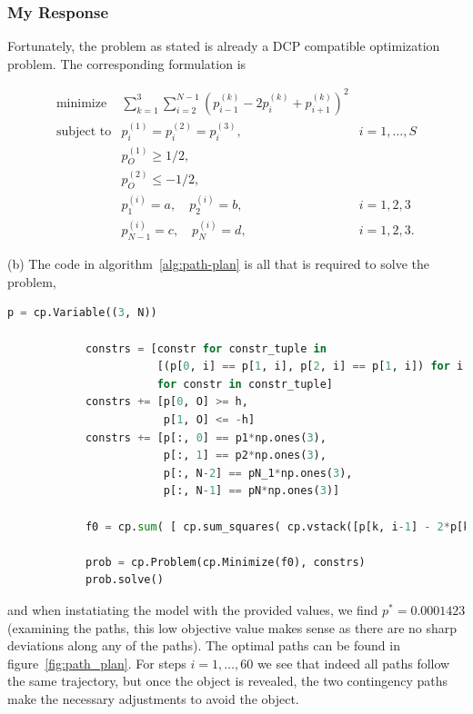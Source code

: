 \documentclass[12pt,reqno]{article}
\theoremstyle{definition}
\numberwithin{equation}{section}
\begin{document}
\subsubsection*{My Response}

Fortunately, the problem as stated is already a DCP compatible optimization problem. The corresponding formulation is

\[\begin{array}{lll}
\text{minimize} \; & \sum_{k=1}^3 \sum_{i=2}^{N-1}\left(p_{i-1}^{(k)}-2 p_i^{(k)}+p_{i+1}^{(k)}\right)^2 & \\
\text{subject to} & p_{i}^{(1)} = p_{i}^{(2)} = p_{i}^{(3)}, & i = 1, \ldots, S \\
& p_{O}^{(1)} \ge 1/2, & \\
& p_{O}^{(2)} \le -1/2, & \\
& p^{(i)}_{1} = a, \quad p^{(i)}_{2} = b, & i = 1, 2, 3 \\
& p^{(i)}_{N-1} = c, \quad p^{(i)}_{N} = d, & i = 1, 2, 3.
\end{array}\]

\noindent (b) The code in algorithm~\ref{alg:path-plan} is all that is required to solve the problem,
\begin{algorithm}[htbp]
    \caption{Path Planning Code}
    \centering
        \begin{lstlisting}[language=Python]
            p = cp.Variable((3, N))

            constrs = [constr for constr_tuple in
                       [(p[0, i] == p[1, i], p[2, i] == p[1, i]) for i in range(2, S+1)]
                       for constr in constr_tuple]
            constrs += [p[0, O] >= h,
                        p[1, O] <= -h]
            constrs += [p[:, 0] == p1*np.ones(3),
                        p[:, 1] == p2*np.ones(3),
                        p[:, N-2] == pN_1*np.ones(3),
                        p[:, N-1] == pN*np.ones(3)]
            
            f0 = cp.sum( [ cp.sum_squares( cp.vstack([p[k, i-1] - 2*p[k, i] + p[k, i+1] for i in range(2, N-2)]) ) for k in range(3)] )
            
            prob = cp.Problem(cp.Minimize(f0), constrs)
            prob.solve()
        \end{lstlisting}
    \label{alg:path-plan}
\end{algorithm}
and when instatiating the model with the provided values, we find $p^* = 0.0001423$ (examining
the paths, this low objective value makes sense as there are no sharp deviations
along any of the paths). 
The optimal paths can be found in figure~\ref{fig:path_plan}. For steps $i=1, \ldots, 60$ we see that
indeed all paths follow the same trajectory, but once the object is revealed, the two contingency paths
make the necessary adjustments to avoid the object.
\end{document}
